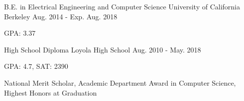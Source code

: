 \vspace{-5mm}
\vspace{-2mm}

\begin{cventries}

  \cventry
    {B.E. in Electrical Engineering and Computer Science} %
    {University of California Berkeley} %
    {Aug. 2014 - Exp. Aug. 2018} %
    {} %
    {
      \begin{cvitems} %
        \item GPA: 3.37
      \end{cvitems}
    }
      \cventry
    {High School Diploma} %
    {Loyola High School} %
    {Aug. 2010 -  May. 2018} %
    {} %
    {
      \begin{cvitems} %
        \item GPA: 4.7, SAT: 2390
        \item National Merit Scholar, Academic Department Award in Computer Science, Highest Honors at Graduation
      \end{cvitems}
    }

\end{cventries}
